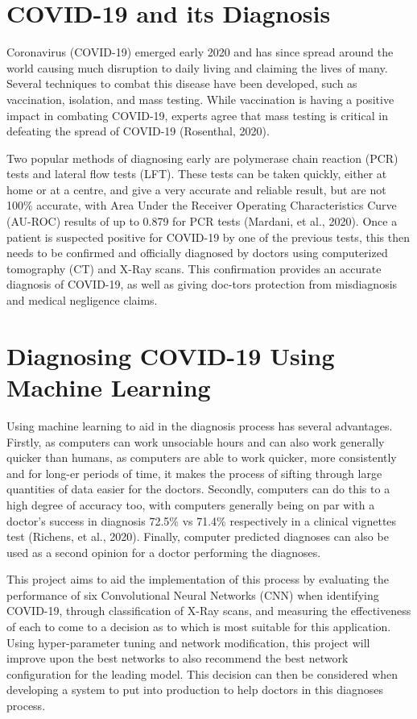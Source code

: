 \section{COVID-19 and its Diagnosis}
Coronavirus (COVID-19) emerged early 2020 and has since spread around the world causing much disruption to daily living and claiming the lives of many. Several techniques to combat this disease have been developed, such as vaccination, isolation, and mass testing. While vaccination is having a positive impact in combating COVID-19, experts agree that mass testing is critical in defeating the spread of COVID-19 (Rosenthal, 2020).

Two popular methods of diagnosing early are polymerase chain reaction (PCR) tests and lateral flow tests (LFT). These tests can be taken quickly, either at home or at a centre, and give a very accurate and reliable result, but are not 100\% accurate, with Area Under the Receiver Operating Characteristics Curve (AU-ROC) results of up to 0.879 for PCR tests (Mardani, et al., 2020). Once a patient is suspected positive for COVID-19 by one of the previous tests, this then needs to be confirmed and officially diagnosed by doctors using computerized tomography (CT) and X-Ray scans. This confirmation provides an accurate diagnosis of COVID-19, as well as giving doc-tors protection from misdiagnosis and medical negligence claims.

\section{Diagnosing COVID-19 Using Machine Learning}
Using machine learning to aid in the diagnosis process has several advantages. Firstly, as computers can work unsociable hours and can also work generally quicker than humans, as computers are able to work quicker, more consistently and for long-er periods of time, it makes the process of sifting through large quantities of data easier for the doctors. Secondly, computers can do this to a high degree of accuracy too, with computers generally being on par with a doctor’s success in diagnosis 72.5\% vs 71.4\% respectively in a clinical vignettes test (Richens, et al., 2020). Finally, computer predicted diagnoses can also be used as a second opinion for a doctor performing the diagnoses. 

This project aims to aid the implementation of this process by evaluating the performance of six Convolutional Neural Networks (CNN) when identifying COVID-19, through classification of X-Ray scans, and measuring the effectiveness of each to come to a decision as to which is most suitable for this application. Using hyper-parameter tuning and network modification, this project will improve upon the best networks to also recommend the best network configuration for the leading model. This decision can then be considered when developing a system to put into production to help doctors in this diagnoses process.